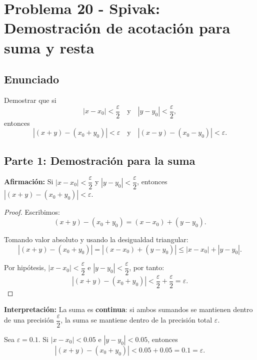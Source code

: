 
\section*{Problema 20 - Spivak: Demostración de acotación para suma y resta}

\subsection*{Enunciado}

Demostrar que si 
\[
|x - x_0| < \frac{\varepsilon}{2} \quad \text{y} \quad |y - y_0| < \frac{\varepsilon}{2},
\]
entonces
\[
|(x + y) - (x_0 + y_0)| < \varepsilon \quad \text{y} \quad |(x - y) - (x_0 - y_0)| < \varepsilon.
\]

\subsection*{Parte 1: Demostración para la suma}

\textbf{Afirmación:} Si $|x - x_0| < \dfrac{\varepsilon}{2}$ y $|y - y_0| < \dfrac{\varepsilon}{2}$, entonces $|(x + y) - (x_0 + y_0)| < \varepsilon$.

\begin{proof}
Escribimos:
\[
(x + y) - (x_0 + y_0) = (x - x_0) + (y - y_0).
\]

Tomando valor absoluto y usando la desigualdad triangular:
\[
|(x + y) - (x_0 + y_0)| = |(x - x_0) + (y - y_0)| \leq |x - x_0| + |y - y_0|.
\]

Por hipótesis, $|x - x_0| < \dfrac{\varepsilon}{2}$ e $|y - y_0| < \dfrac{\varepsilon}{2}$, por tanto:
\[
|(x + y) - (x_0 + y_0)| < \frac{\varepsilon}{2} + \frac{\varepsilon}{2} = \varepsilon.
\]
\end{proof}

\textbf{Interpretación:} La suma es \textbf{continua}: si ambos sumandos se mantienen dentro de una precisión $\dfrac{\varepsilon}{2}$, la suma se mantiene dentro de la precisión total $\varepsilon$.

\begin{ejemplo}
Sea $\varepsilon = 0.1$. Si $|x - x_0| < 0.05$ e $|y - y_0| < 0.05$, entonces
\[
|(x + y) - (x_0 + y_0)| < 0.05 + 0.05 = 0.1 = \varepsilon.
\]
\end{ejemplo}


